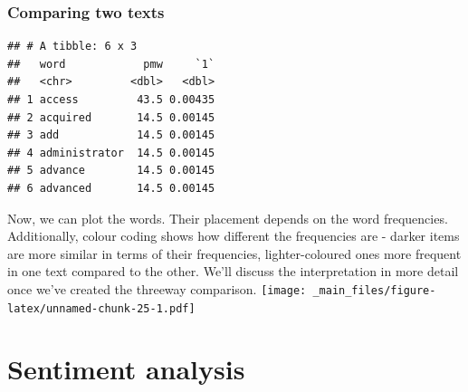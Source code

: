 \documentclass[a4paper, nobind]{templates/ociamthesis}
\begin{document}
\hypertarget{comparing-two-texts}{%
\subsection{Comparing two texts}\label{comparing-two-texts}}

\begin{verbatim}
## # A tibble: 6 x 3
##   word            pmw     `1`
##   <chr>         <dbl>   <dbl>
## 1 access         43.5 0.00435
## 2 acquired       14.5 0.00145
## 3 add            14.5 0.00145
## 4 administrator  14.5 0.00145
## 5 advance        14.5 0.00145
## 6 advanced       14.5 0.00145
\end{verbatim}

Now, we can plot the words. Their placement depends on the word frequencies. Additionally, colour coding shows how different the frequencies are - darker items are more similar in terms of their frequencies, lighter-coloured ones more frequent in one text compared to the other. We'll discuss the interpretation in more detail once we've created the threeway comparison.
\texttt{[image: \_main\_files/figure-latex/unnamed-chunk-25-1.pdf]}

\hypertarget{sentiment-analysis}{%
\chapter{Sentiment analysis}\label{sentiment-analysis}}
\end{document}
